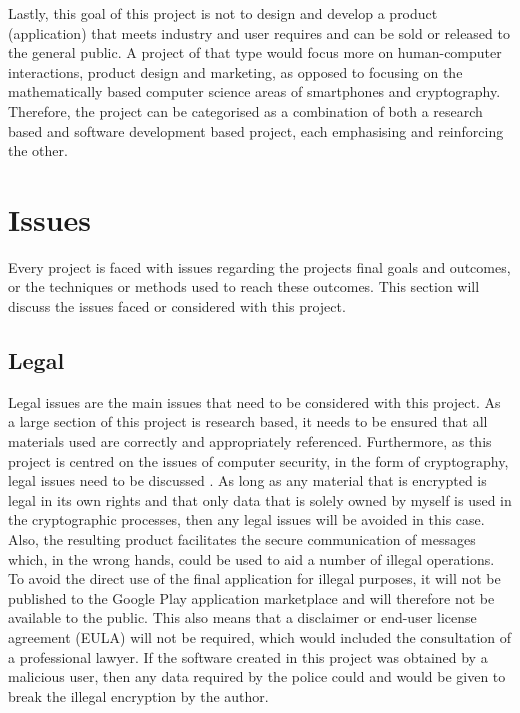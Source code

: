 \documentclass[a4paper,10pt]{report}
\begin{document}
Lastly, this goal of this project is not to design and develop a product (application) that meets industry and user requires and can be sold or released to the general public. A project of that type would focus more on human-computer interactions, product design and marketing, as opposed to focusing on the mathematically based computer science areas of smartphones and cryptography. Therefore, the project can be categorised as a combination of both a research based and software development based project, each emphasising and reinforcing the other. 

\section{Issues}

Every project is faced with issues regarding the projects final goals and outcomes, or the techniques or methods used to reach these outcomes. This section will discuss the issues faced or considered with this project. 

\subsection{Legal}

Legal issues are the main issues that need to be considered with this project. As a large section of this project is research based, it needs to be ensured that all materials used are correctly and appropriately referenced. Furthermore, as this project is centred on the issues of computer security, in the form of cryptography, legal issues need to be discussed \cite{dataprotect} \cite{internetlaw}. As long as any material that is encrypted is legal in its own rights and that only data that is solely owned by myself is used in the cryptographic processes, then any legal issues will be avoided in this case. Also, the resulting product facilitates the secure communication of messages which, in the wrong hands, could be used to aid a number of illegal operations. To avoid the direct use of the final application for illegal purposes, it will not be published to the Google Play application marketplace and will therefore not be available to the public. This also means that a disclaimer or end-user license agreement (EULA) will not be required, which would included the consultation of a professional lawyer. If the software created in this project was obtained by a malicious user, then any data required by the police could and would be given to break the illegal encryption by the author.
\end{document}
